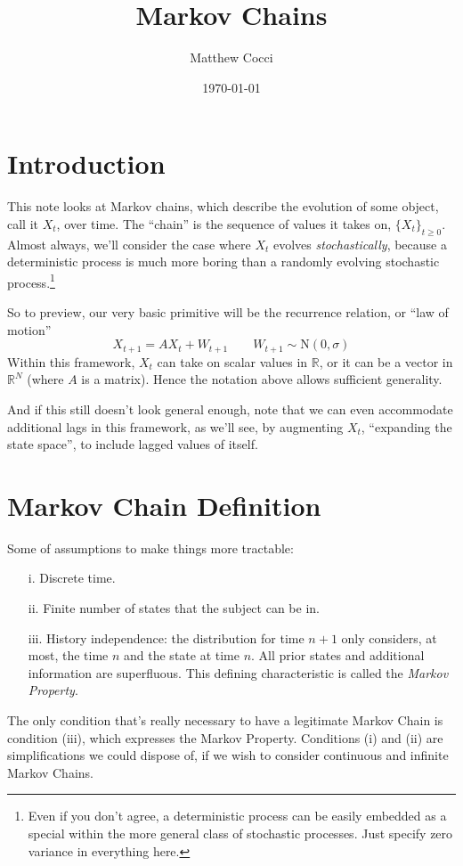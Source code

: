 \documentclass[12pt]{article}
\author{Matthew Cocci}
\title{Markov Chains}
\date{\today}
\theoremstyle{plain}
\theoremstyle{definition}
\theoremstyle{remark}
\begin{document}
\maketitle

\section{Introduction}

This note looks at Markov chains, which describe the evolution of some object, call it $X_t$, over time. The ``chain'' is the sequence of values it takes on, $\{X_t\}_{t\geq0}$. Almost always, we'll consider the case where $X_t$ evolves \emph{stochastically}, because a deterministic process is much more boring than a randomly evolving stochastic process.\footnote{Even if you don't agree, a deterministic process can be easily embedded as a special within the more general class of stochastic processes. Just specify zero variance in everything here.} 

So to preview, our very basic primitive will be the recurrence relation, or ``law of motion''
\begin{equation}
    X_{t+1} = AX_t + W_{t+1}
    \qquad W_{t+1} \sim \text{N}(0,\sigma)
\end{equation}
Within this framework, $X_t$ can take on scalar values in $\mathbb{R}$, or it can be a vector in $\mathbb{R}^N$ (where $A$ is a matrix). Hence the notation above allows sufficient generality. 

And if this still doesn't look general enough, note that we can even accommodate additional lags in this framework, as we'll see, by augmenting $X_t$, ``expanding the state space'', to include lagged values of itself.





\section{Markov Chain Definition}

Some of assumptions to make things more tractable:
\begin{enumerate}
   \item[i.]{Discrete time.}
   \item[ii.]{Finite number of states that the subject can be in.}
   \item[iii.]{History independence: the distribution for time $n+1$
      only considers, at most, the time $n$ and the state at time $n$.
      All prior states and additional information are superfluous. 
      This defining characteristic is called the {\sl Markov
      Property}.}
\end{enumerate}
The only condition that's really necessary to have a legitimate 
Markov Chain is condition (iii), which expresses the Markov Property.
Conditions (i) and (ii) are simplifications we could dispose of, if
we wish to consider continuous and infinite Markov Chains.
\end{document}
